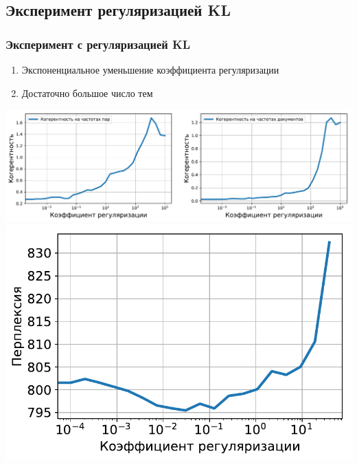 \documentclass[unicode]{beamer}
\begin{document}
\subsection{Эксперимент регуляризацией KL}
\begin{frame}
\frametitle{Эксперимент с регуляризацией KL}
\begin{enumerate}
    \item Экспоненциальное уменьшение коэффициента регуляризации
    \item Достаточно большое число тем
\end{enumerate}
\begin{center}
    \includegraphics[scale=0.30]{coherence_tf_reg_on_ppmi_mmro.pdf}
    \includegraphics[scale=0.30]{perplexity_tf_reg_on_ppmi_mmro.pdf}
\end{center}
\end{frame}


\end{document}

